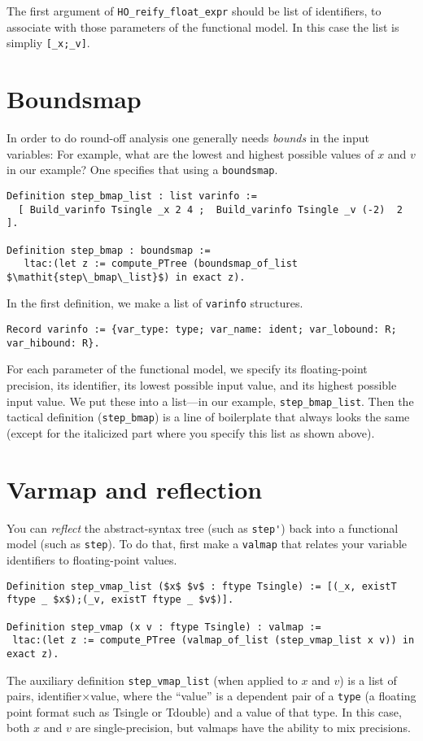 \documentclass[article]{memoir}
\begin{document}
The first argument of \lstinline{HO_reify_float_expr}
should be list of identifiers, to associate with those
parameters of the functional model.  In this case the list is
simpliy \lstinline{[_x;_v]}.

\chapter{Boundsmap}

In order to do round-off analysis one generally needs \emph{bounds}
in the input variables:
For example, what are the lowest and highest possible
values of $x$ and $v$ in our example?
One specifies that using a \lstinline{boundsmap}.

\begin{lstlisting}
Definition step_bmap_list : list varinfo := 
  [ Build_varinfo Tsingle _x 2 4 ;  Build_varinfo Tsingle _v (-2)  2 ].

Definition step_bmap : boundsmap :=
   ltac:(let z := compute_PTree (boundsmap_of_list $\mathit{step\_bmap\_list}$) in exact z).
\end{lstlisting}
In the first definition, we make a list of \lstinline{varinfo} structures.

\begin{lstlisting}
Record varinfo := {var_type: type; var_name: ident; var_lobound: R; var_hibound: R}.
\end{lstlisting}
For each parameter of the functional model, we specify its floating-point precision, its identifier, its lowest possible input value,
and its highest possible input value.  
We put these into a list---in our example, \lstinline{step_bmap_list}.
Then the tactical definition (\lstinline{step_bmap}) is
a line of boilerplate that always looks the same
(except for the italicized part where you specify this list
as shown above).


\chapter{Varmap and reflection}

You can \emph{reflect} the abstract-syntax tree (such as \lstinline{step'})
back into a functional model (such as \lstinline{step}).
To do that, first make a \lstinline{valmap} that relates your
variable identifiers to floating-point values.

\begin{lstlisting}
Definition step_vmap_list ($x$ $v$ : ftype Tsingle) := [(_x, existT ftype _ $x$);(_v, existT ftype _ $v$)].

Definition step_vmap (x v : ftype Tsingle) : valmap :=
 ltac:(let z := compute_PTree (valmap_of_list (step_vmap_list x v)) in exact z).
\end{lstlisting}
The auxiliary definition \lstinline{step_vmap_list}
(when applied to $x$ and $v$)
is a list of pairs, identifier$\times$value,
where the ``value'' is a dependent pair of a \lstinline{type} (a floating
point format such as Tsingle or Tdouble) and a value of that type.
In this case, both $x$ and $v$ are single-precision,
but valmaps have the ability to mix precisions.
\end{document}
